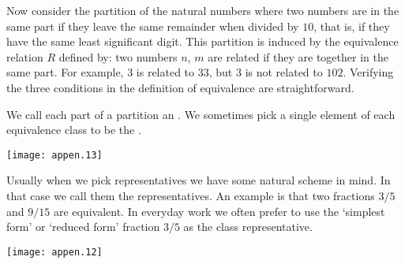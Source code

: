 Now consider the partition of the natural numbers where
two numbers are in the same part if they leave the same remainder when
divided by $10$, that is, if they have the same least significant digit.
This partition is induced by the equivalence relation $R$ defined by:
two numbers $n$, $m$ are related if they are together in the same part.
For example, $3$ is related to $33$, but $3$ is not related to $102$.
Verifying the three conditions in the definition of equivalence are 
straightforward.

We call each part of a partition an .%
We sometimes pick a single element of each equivalence class to be the 
.%
\begin{center}
  \texttt{[image: appen.13]}
\end{center}
Usually when we pick representatives we have some natural scheme in mind.
In that case we call them the
 representatives.%
%
%
An example is that
two fractions \( 3/5 \) and \( 9/15 \) are equivalent.
In everyday work we often prefer to use the `simplest form' or `reduced form'
fraction $3/5$ as the class representative.
\begin{center}
  \texttt{[image: appen.12]}
\end{center}
%
